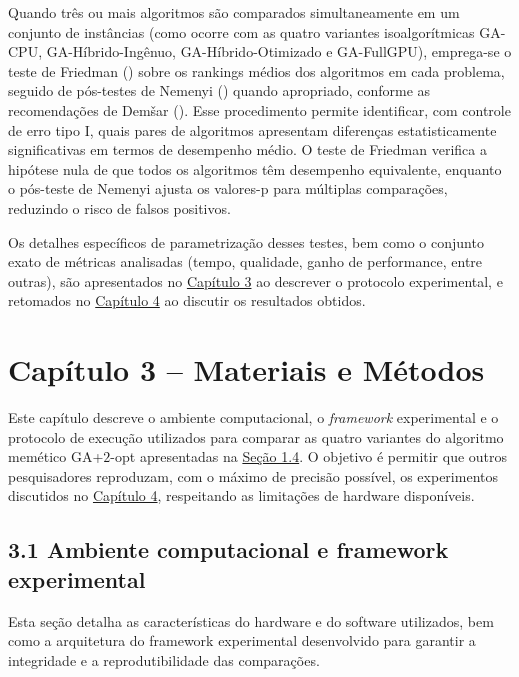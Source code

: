 Quando três ou mais algoritmos são comparados simultaneamente em um
conjunto de instâncias (como ocorre com as quatro variantes
isoalgorítmicas GA-CPU, GA-Híbrido-Ingênuo, GA-Híbrido-Otimizado e
GA-FullGPU), emprega-se o teste de Friedman
() sobre os rankings médios dos
algoritmos em cada problema, seguido de pós-testes de Nemenyi
() quando apropriado, conforme
as recomendações de Demšar ().
Esse procedimento permite identificar, com controle de erro tipo I,
quais pares de algoritmos apresentam diferenças estatisticamente
significativas em termos de desempenho médio. O teste de Friedman
verifica a hipótese nula de que todos os algoritmos têm desempenho
equivalente, enquanto o pós-teste de Nemenyi ajusta os valores-p para
múltiplas comparações, reduzindo o risco de falsos positivos.

Os detalhes específicos de parametrização desses testes, bem como o
conjunto exato de métricas analisadas (tempo, qualidade, ganho de
performance, entre outras), são apresentados no
\hyperref[cap3-materiais-metodos]{Capítulo 3} ao descrever o protocolo
experimental, e retomados no \hyperref[cap4-resultados]{Capítulo 4} ao
discutir os resultados obtidos.

\section{Capítulo 3 -- Materiais e
Métodos}\label{cap3-materiais-metodos}

Este capítulo descreve o ambiente computacional, o \emph{framework}
experimental e o protocolo de execução utilizados para comparar as
quatro variantes do algoritmo memético GA+\(2\)-opt apresentadas na
\hyperref[sec-14-objetivos-especificos]{Seção 1.4}. O objetivo é
permitir que outros pesquisadores reproduzam, com o máximo de precisão
possível, os experimentos discutidos no
\hyperref[cap4-resultados]{Capítulo 4}, respeitando as limitações de
hardware disponíveis.

\subsection{3.1 Ambiente computacional e framework
experimental}\label{sec-31-ambiente-framework}

Esta seção detalha as características do hardware e do software
utilizados, bem como a arquitetura do framework experimental
desenvolvido para garantir a integridade e a reprodutibilidade das
comparações.

